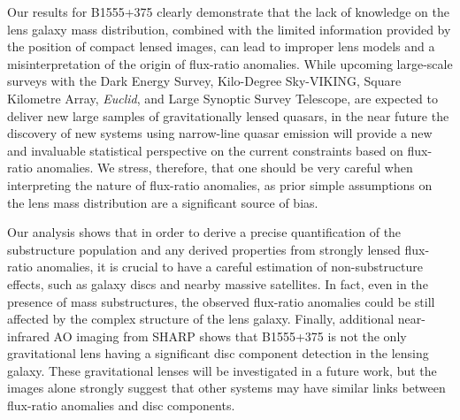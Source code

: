 \documentclass[a4paper,fleqn,usenatbib,useAMS]{mnras}
\begin{document}


 
Our results for B1555+375 clearly demonstrate that the lack of knowledge on the lens galaxy mass distribution, combined with the limited information provided by the position of compact lensed images, can lead to improper lens models and a misinterpretation of the origin of flux-ratio anomalies. While upcoming large-scale surveys with the Dark Energy Survey, Kilo-Degree Sky-VIKING, Square Kilometre Array, {\it Euclid}, and Large Synoptic Survey Telescope, are expected to deliver new large samples of gravitationally lensed quasars, in the near future the discovery of new systems using narrow-line quasar emission \citep{N14} will provide a new and invaluable statistical perspective on the current constraints based on flux-ratio anomalies. We stress, therefore, that one should be very careful when interpreting the nature of flux-ratio anomalies, as prior simple assumptions on the lens mass distribution are a significant source of bias. 

Our analysis shows that in order to derive a precise quantification of the substructure population and any derived properties from strongly lensed flux-ratio anomalies, it is crucial to have a careful estimation of non-substructure effects, such as galaxy discs and nearby massive satellites. In fact, even in the presence of mass substructures, the observed flux-ratio anomalies could be still affected by the complex structure of the lens galaxy. Finally, additional near-infrared AO imaging from SHARP shows that B1555+375 is not the only gravitational lens having a significant disc component detection in the lensing galaxy.  These gravitational lenses will be investigated in a future work, but the images alone strongly suggest that other systems may have similar links between flux-ratio anomalies and disc components.
\end{document}
